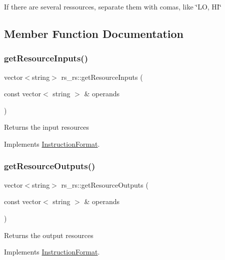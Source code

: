 If there are several ressources, separate them with comas, like \char`\"{}\+L\+O, H\+I\char`\"{} 

\subsection{Member Function Documentation}
\mbox{\label{classrs__rs_a0f171a0f2819f3980516ee0c12707f8b}} 
\subsubsection{\texorpdfstring{get\+Resource\+Inputs()}{getResourceInputs()}}
{\footnotesize\ttfamily vector$<$string$>$ rs\+\_\+rs\+::get\+Resource\+Inputs (\begin{DoxyParamCaption}\item[{const vector$<$ string $>$ \&}]{operands }\end{DoxyParamCaption})\hspace{0.3cm}{\ttfamily [virtual]}}

Returns the input resources 

Implements \hyperlink{classInstructionFormat_a09775d3a3c22f40a0f44504664e586e4}{Instruction\+Format}.

\mbox{\label{classrs__rs_ad0ceb0c23af2d485184ca1229ab27483}} 
\subsubsection{\texorpdfstring{get\+Resource\+Outputs()}{getResourceOutputs()}}
{\footnotesize\ttfamily vector$<$string$>$ rs\+\_\+rs\+::get\+Resource\+Outputs (\begin{DoxyParamCaption}\item[{const vector$<$ string $>$ \&}]{operands }\end{DoxyParamCaption})\hspace{0.3cm}{\ttfamily [virtual]}}

Returns the output resources 

Implements \hyperlink{classInstructionFormat_a95cd28ffb1bde59b67f676880ab10536}{Instruction\+Format}.

